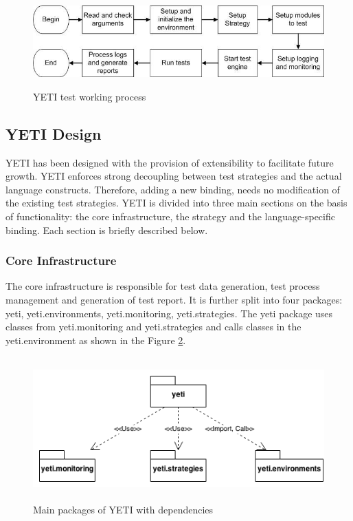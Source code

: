 \begin{figure}[h]
	\centering
	\includegraphics[width=14.5cm, height=3.5cm]{chapter3/yetiOverview.png}
	\caption{YETI test working process}
	\label{fig:yetiOverview}
\end{figure}


\subsection{YETI Design}
YETI has been designed with the provision of extensibility to facilitate future growth. YETI enforces strong decoupling between test strategies and the actual language constructs. Therefore, adding a new binding, needs no modification of the existing test strategies. YETI is divided into three main sections on the basis of functionality: the core infrastructure, the strategy and the language-specific binding. Each section is briefly described below. 

\subsubsection{Core Infrastructure}
The core infrastructure is responsible for test data generation, test process management and generation of test report. It is further split into four packages: yeti, yeti.environments, yeti.monitoring, yeti.strategies. The yeti package uses classes from yeti.monitoring and yeti.strategies and calls classes in the yeti.environment as shown in the Figure \ref{fig:yetiCore}. 

\begin{figure}[h]
	\centering
	\includegraphics[width=14.5cm, height=5.5cm]{chapter3/yetiCore.png}
	\caption{Main packages of YETI with dependencies }
	\label{fig:yetiCore}
\end{figure}

